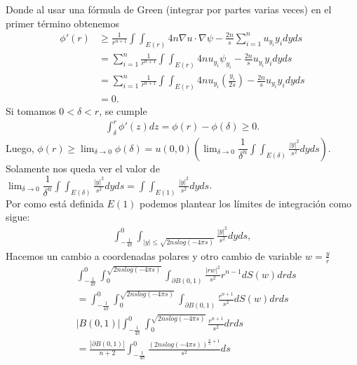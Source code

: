 \begin{homeworkProblem}
\begin{solucion}
    Donde al usar una fórmula de Green (integrar por partes varias veces) en el primer término obtenemos
    \begin{align*}
      \phi ' (r) &\geq \frac{1}{r^{n+1}} \int \int_{E(r)} 4n \nabla u \cdot \nabla \psi - \frac{2n}{s} \displaystyle \sum_{i=1}^{n} u_{y_{i}}y_{i} dyds\\ 
                 &=\displaystyle \sum_{i=1}^{n} \frac{1}{r^{n+1}} \int \int_{E(r)} 4n u_{y_{i}} \psi_{y_{i}} - \frac{2n}{s} u_{y_{i}}y_{i} dyds\\ 
                 &= \displaystyle \sum_{i=1}^{n} \frac{1}{r^{n+1}} \int \int_{E(r)} 4n u_{y_{i}} \left( \frac{y_{i}}{2s}\right) - \frac{2n}{s} u_{y_{i}}y_{i} dyds\\ 
                 &=0.
    \end{align*} 
    Si tomamos $0< \delta < r$, se cumple
    \begin{align*}
      \int_{\delta}^{r} \phi '(z) dz = \phi(r) - \phi(\delta) \geq 0.
    \end{align*}
    Luego, $\phi(r) \geq \lim_{\delta \rightarrow 0} \phi(\delta) = u(0,0) \left(\lim_{\delta \rightarrow 0} \dfrac{1}{\delta ^{n}} \displaystyle \int \displaystyle \int_{E(\delta)} \frac{|y|^{2}}{s^{2}} dyds\right)$.\\ 
    Solamente nos queda ver el valor de $\lim_{\delta \rightarrow 0} \dfrac{1}{\delta ^{n}} \displaystyle \int \displaystyle \int_{E(\delta)} \frac{|y|^{2}}{s^{2}} dyds = \displaystyle \int \displaystyle \int_{E(1)} \frac{|y|^{2}}{s^{2}} dyds$.\\ 
    Por como está definida $E(1)$ podemos plantear los límites de integración como sigue:
    \begin{align*}
      \int_{-\frac{1}{4\pi}}^{0} \int_{|y| \leq \sqrt{2nslog(-4\pi s)}} \frac{|y|^{2}}{s^{2}} dyds,
    \end{align*}
    Hacemos un cambio a coordenadas polares y otro cambio de variable $w = \frac{y}{r}$
    \begin{align*}
      &\int_{-\frac{1}{4\pi}}^{0} \int_{0}^{\sqrt{2nslog(-4\pi s)}} \int_{\partial B(0,1)} \frac{|rw|^{2}}{s^{2}} r^{n-1} dS(w)drds\\
      &= \int_{-\frac{1}{4\pi}}^{0} \int_{0}^{\sqrt{2nslog(-4\pi s)}} \int_{\partial B(0,1)} \frac{r^{n+1}}{s^{2}} dS(w)drds\\
      &|B(0,1)| \int_{-\frac{1}{4\pi}}^{0} \int_{0}^{\sqrt{2nslog(-4\pi s)}} \frac{r^{n+1}}{s^{2}} drds\\ 
      &= \frac{|\partial B(0,1)|}{n+2} \int_{-\frac{1}{4\pi}}^{0} \frac{(2nslog(-4\pi s))^{\frac{n}{2} + 1}}{s^{2}} ds\\ 

\end{align*}
\end{solucion}
\end{homeworkProblem}
